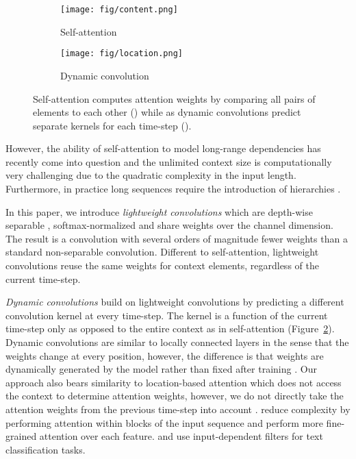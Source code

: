 \documentclass{article} \usepackage{iclr2019_conference,times}
\def\sdconvfull{lightweight convolution}
\def\Tvsdconvfull{Dynamic convolution}
\begin{document}
\begin{figure}[h]
\centering
\begin{subfigure}[b]{0.45\textwidth}
\centering
\texttt{[image: fig/content.png]}
\caption{Self-attention}
\label{fig:sattn2}
\end{subfigure}
\qquad \quad
\begin{subfigure}[b]{0.45\textwidth}
\centering
\texttt{[image: fig/location.png]}
\caption{Dynamic convolution}
\label{fig:dsdconv}
\end{subfigure}
\caption{Self-attention computes attention weights by comparing all pairs of elements to each other () while as dynamic convolutions predict separate kernels for each time-step ().}
\label{fig:attention}
\end{figure}

However, the ability of self-attention to model long-range dependencies has recently come into question \citep{tang2018why} and the unlimited context size is computationally very challenging due to the quadratic complexity in the input length. 
Furthermore, in practice long sequences require the introduction of hierarchies \citep{liu2018wikisum}. 

In this paper, we introduce \emph{\sdconvfull{}s} which are depth-wise separable \citep{sifre2014rigid,Chollet2017XceptionDL,kaiser2017depthwise}, softmax-normalized and share weights over the channel dimension.
The result is a convolution with several orders of magnitude fewer weights than a standard non-separable convolution. 
Different to self-attention, \sdconvfull{}s reuse the same weights for context elements, regardless of the current time-step.

\emph{\Tvsdconvfull{}s} build on \sdconvfull{}s by predicting a different convolution kernel at every time-step. The kernel is a function of the current time-step only as opposed to the entire context as in self-attention (Figure~\ref{fig:dsdconv}).
\Tvsdconvfull{}s are similar to locally connected layers in the sense that the weights change at every position, however, the difference  is that weights are dynamically generated by the model rather than fixed after training \citep{lecun1998grad,taigman2014deepface,chen2015interspeech}.
Our approach also bears similarity to location-based attention which does not access the context to determine attention weights, however, we do not directly take the attention weights from the previous time-step into account \citep{chorowski2015asr,luong2015effective}.
\citet{shen2018block} reduce complexity by performing attention within blocks of the input sequence and 
\citet{shen2017disan,shen2018fast} perform more fine-grained attention over each feature.
\citet{shen2018emnlp} and \citet{gong2018emnlp} use input-dependent filters for text classification tasks.
\end{document}
